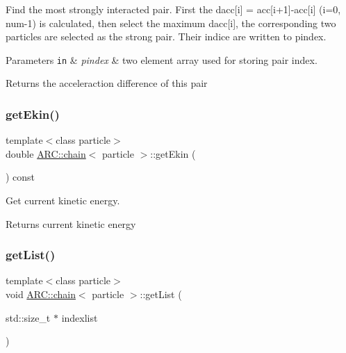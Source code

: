 Find the most strongly interacted pair. First the dacc\mbox{[}i\mbox{]} = acc\mbox{[}i+1\mbox{]}-\/acc\mbox{[}i\mbox{]} (i=0, num-\/1) is calculated, then select the maximum dacc\mbox{[}i\mbox{]}, the corresponding two particles are selected as the strong pair. Their indice are written to pindex. 
\begin{DoxyParams}[1]{Parameters}
\mbox{\tt in}  & {\em pindex} & two element array used for storing pair index. \\
\hline
\end{DoxyParams}
\begin{DoxyReturn}{Returns}
the acceleraction difference of this pair 
\end{DoxyReturn}
\hypertarget{classARC_1_1chain_ad7e8b3a20521f095a6935845f8a2ee53}{}\label{classARC_1_1chain_ad7e8b3a20521f095a6935845f8a2ee53} 
\subsubsection{\texorpdfstring{get\+Ekin()}{getEkin()}}
{\footnotesize\ttfamily template$<$class particle$>$ \\
double \hyperlink{classARC_1_1chain}{A\+R\+C\+::chain}$<$ particle $>$\+::get\+Ekin (\begin{DoxyParamCaption}{ }\end{DoxyParamCaption}) const\hspace{0.3cm}{\ttfamily [inline]}}



Get current kinetic energy. 

\begin{DoxyReturn}{Returns}
current kinetic energy 
\end{DoxyReturn}
\hypertarget{classARC_1_1chain_a7510058f08a82b2ca18b2d32b56a6488}{}\label{classARC_1_1chain_a7510058f08a82b2ca18b2d32b56a6488} 
\subsubsection{\texorpdfstring{get\+List()}{getList()}}
{\footnotesize\ttfamily template$<$class particle$>$ \\
void \hyperlink{classARC_1_1chain}{A\+R\+C\+::chain}$<$ particle $>$\+::get\+List (\begin{DoxyParamCaption}\item[{std\+::size\+\_\+t $\ast$}]{indexlist }\end{DoxyParamCaption})\hspace{0.3cm}{\ttfamily [inline]}}



